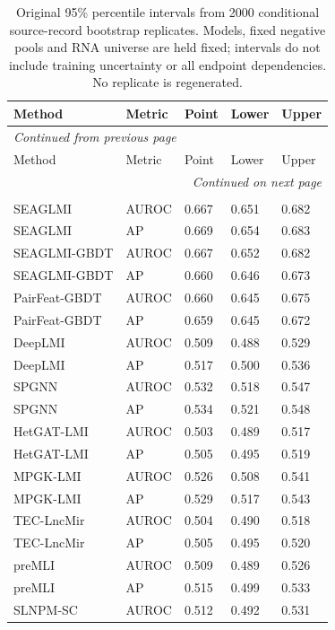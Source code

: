 {\scriptsize
\setlength{\tabcolsep}{4pt}
\renewcommand{\arraystretch}{1.08}
\begin{longtable}{lllll}
\caption{Original 95\% percentile intervals from 2000 conditional source-record bootstrap replicates. Models, fixed negative pools and RNA universe are held fixed; intervals do not include training uncertainty or all endpoint dependencies. No replicate is regenerated.}\label{tab:screened-C1-intervals}\\
\toprule
Method & Metric & Point & Lower & Upper \\
\midrule
\endfirsthead
\multicolumn{5}{l}{\textit{Continued from previous page}}\\
\toprule
Method & Metric & Point & Lower & Upper \\
\midrule
\endhead
\midrule
\multicolumn{5}{r}{\textit{Continued on next page}}\\
\endfoot
\bottomrule
\endlastfoot
\multicolumn{5}{l}{\textit{Strict | outer 1:1}}\\
SEAGLMI & AUROC & 0.667 & 0.651 & 0.682 \\
SEAGLMI & AP & 0.669 & 0.654 & 0.683 \\
SEAGLMI-GBDT & AUROC & 0.667 & 0.652 & 0.682 \\
SEAGLMI-GBDT & AP & 0.660 & 0.646 & 0.673 \\
PairFeat-GBDT & AUROC & 0.660 & 0.645 & 0.675 \\
PairFeat-GBDT & AP & 0.659 & 0.645 & 0.672 \\
DeepLMI & AUROC & 0.509 & 0.488 & 0.529 \\
DeepLMI & AP & 0.517 & 0.500 & 0.536 \\
SPGNN & AUROC & 0.532 & 0.518 & 0.547 \\
SPGNN & AP & 0.534 & 0.521 & 0.548 \\
HetGAT-LMI & AUROC & 0.503 & 0.489 & 0.517 \\
HetGAT-LMI & AP & 0.505 & 0.495 & 0.519 \\
MPGK-LMI & AUROC & 0.526 & 0.508 & 0.541 \\
MPGK-LMI & AP & 0.529 & 0.517 & 0.543 \\
TEC-LncMir & AUROC & 0.504 & 0.490 & 0.518 \\
TEC-LncMir & AP & 0.505 & 0.495 & 0.520 \\
preMLI & AUROC & 0.509 & 0.489 & 0.526 \\
preMLI & AP & 0.515 & 0.499 & 0.533 \\
SLNPM-SC & AUROC & 0.512 & 0.492 & 0.531 \\

\end{longtable}}
